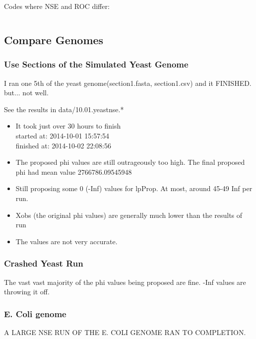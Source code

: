Codes where NSE and ROC differ:
\begin{verbatim}
\end{verbatim}

\subsection{Compare Genomes}

\subsubsection{Use Sections of the Simulated Yeast Genome}
I ran one 5th of the yeast genome(section1.fasta, section1.csv) and it FINISHED. but... not well.

See the results in data/10.01.yeastnse.*

\begin{itemize}
\item It took just over 30 hours to finish\\
started at: 2014-10-01 15:57:54\\
finished at: 2014-10-02 22:08:56 

\item The proposed phi values are still outrageously too high. The final proposed phi had mean value 2766786.09545948

\item Still proposing some 0 (-Inf) values for lpProp. At most, around 45-49 Inf per run.

\item Xobs (the original phi values) are generally much lower than the results of run

\item The values are not very accurate.

\end{itemize}


\subsubsection{Crashed Yeast Run}

The vast vast majority of the phi values being proposed are fine. -Inf values are throwing it off. 


\subsubsection{E. Coli genome}

A LARGE NSE RUN OF THE E. COLI GENOME RAN TO COMPLETION.




